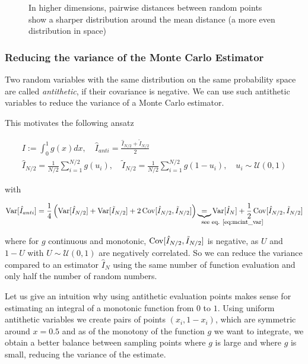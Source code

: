 \begin{figure}[!htb]
 \centering
 \hfill
 \caption{In higher dimensions, pairwise distances between random points show a sharper distribution around the mean distance
 (a more even distribution in space)}
 \label{fig:curse}
\end{figure}

\subsubsection{Reducing the variance of the Monte Carlo Estimator}


Two random variables with the same distribution on the same probability space are called \textit{antithetic}, if their covariance is negative.
We can use such antithetic variables to reduce the variance of a Monte Carlo estimator.

This motivates the following ansatz

\begin{equation}
    \begin{multlined}
        I := \int_{0}^{1} g(x) dx, \quad \hat{I}_{anti} = \frac{\hat{I}_{N / 2} + \tilde{I}_{N / 2}}{2} \\
        \hat{I}_{N / 2} = \frac{1}{N / 2} \sum_{i=1}^{N / 2} g(u_i), \quad \tilde{I}_{N / 2} = \frac{1}{N / 2} \sum_{i=1}^{N / 2} g(1 - u_i), \quad u_i \sim \mathcal{U}(0, 1)
    \end{multlined}
\end{equation}

with

\begin{equation}
    \Var[\hat{I}_{anti}] = \frac{1}{4} \left(\Var[\hat{I}_{N / 2}] + \Var[\tilde{I}_{N / 2}] + 2 \Cov[\hat{I}_{N / 2}, \tilde{I}_{N / 2}]\right) \explain{=}{\text{see eq. \ref{eq:mcint_var}}} \Var[\hat{I}_N] + \frac{1}{2} \Cov[\hat{I}_{N / 2}, \tilde{I}_{N / 2}]
\end{equation}

where for $g$ continuous and monotonic, $\operatorname{Cov}[\hat{I}_{N / 2}, \tilde{I}_{N / 2}]$ is negative, as $U$ and $1 - U$ with $U \sim \mathcal{U}(0, 1)$ are negatively correlated. So we can reduce the variance compared to an estimator $\hat{I}_N$ using the same number of function 
evaluation and only half the number of random numbers.

Let us give an intuition why using antithetic evaluation points makes sense for estimating an integral of a monotonic function from $0$ to $1$. Using uniform antithetic variables we create pairs of points $(x_i, 1 - x_i)$, which are symmetric around $x = 0.5$ and as of the monotony of the function $g$ we want to integrate, we obtain a better balance between sampling points where $g$ is large and where $g$ is small, reducing the variance of the estimate.


